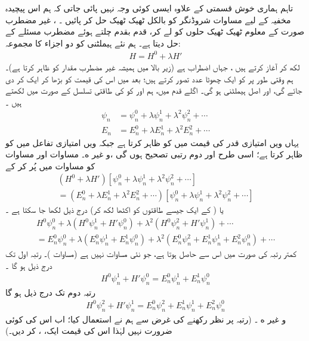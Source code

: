 تاہم ہماری  خوش قسمتی کے علاوہ ایسی   کوئی وجہ   نہیں  پائی  جاتی کہ  ہم اس  پیچیدہ مخفیہ کے لیے مساوات شروڈنگر کو بالکل ٹھیک ٹھیک حل کر  پائیں ۔ ،      غیر  مضطرب صورت کے معلوم ٹھیک ٹھیک حلوں کو لے کر،  قدم بقدم چلتے ہوئے مضطرب مسئلے کے    حل دیتا ہے۔  ہم نئے  ہیملٹنی کو دو اجزاء کا  مجموعہ:
\begin{align}
H = H^0 + \lambda H'
\end{align}
 لکھ کر آغاز کرتے ہیں ، جہاں  اضطراب ہے (زیر بالا میں  ہمیشہ  غیر  مضطرب مقدار کو ظاہر کرتا ہے)۔  ہم وقتی طور پر  کو ایک چھوٹا عدد تصور کرتے ہیں؛  بعد میں اس کی قیمت کو بڑھا کر ایک  کر دی جائے گی،  اور  اصل ہیملٹنی ہو گی۔ اگلے  قدم میں،   ہم  اور  کو  کی طاقتی تسلسل کے صورت میں لکھتے ہیں ۔
\begin{align}
\psi_n &= \psi_n^0 + \lambda\psi_n^1 + \lambda^2\psi_n^2+\cdots \label{مساوات_اضطراب_سائے_این}\\
E_n &= E_n^0 + \lambda E_n^1 + \lambda^2 E_n^2+\cdots \label{مساوات_اضطراب_ای_این}
\end{align} 
یہاں  ویں امتیازی قدر کی قیمت میں  کو  ظاہر کرتا ہے جبکہ  ویں امتیازی تفاعل میں  کو   ظاہر کرتا ہے؛ اسی طرح  اور  دوم رتبی تصحیح ہوں گی ،و غیر ه۔ مساوات  اور مساوات  کو مساوات  میں پُر کر کے 
\begin{multline*}
(H^0 + \lambda H')[\psi_n^0 + \lambda \psi_n^1 + \lambda^2 \psi_n^2 + \cdots]\\
= (E_n^0 + \lambda E_n^1 + \lambda^2 E_n^2 + \cdots)[\psi_n^0 + \lambda \psi_n^1 + \lambda^2 \psi_n^2 + \cdots]
\end{multline*}
یا (  کے ایک جیسے طاقتوں کو اکٹھا لکھ کر)  درج ذیل لکھا جا سکتا ہے ۔
\begin{multline*}
H^0 \psi_n^0 + \lambda (H^0 \psi_n^1 + H' \psi_n^0) + \lambda^2 (H^0 \psi_n^2 + H' \psi_n^1) + \cdots \\
= E_n^0 \psi_n^0 + \lambda (E_n^0 \psi_n^1 + E_n^1 \psi_n^0) + \lambda^2 (E_n^0 \psi_n^2 + E_n^1 \psi_n^1 + E_n^2 \psi_n^0) + \cdots
\end{multline*}
 کمتر رتبہ  کی صورت میں اس سے  حاصل ہوتا ہے،  جو   نئی مساوات نہیں ہے (مساوات )۔ رتبہ اول  تک درج ذیل ہو گا ۔
\begin{align}\label{مساوات_اضطراب_رتبہ_اول}
H^0 \psi_n^1 + H' \psi_n^0 = E_n^0 \psi_n^1 + E_n^1 \psi_n^0
\end{align}
رتبہ دوم  تک درج ذیل ہو گا 
\begin{align}\label{مساوات_اضطراب_رتبہ_دوم}
H^0 \psi_n^2 + H' \psi_n^1 = E_n^0 \psi_n^2 + E_n^1 \psi_n^1 + E_n^2 \psi_n^0
\end{align}
و غیر ه ۔ (رتبہ  پر نظر رکھنے کی غرض سے ہم نے  استعمال کیا؛ اب اس کی کوئی  ضرورت نہیں  لہٰذا اس کی قیمت ایک، ، کر دیں۔)

